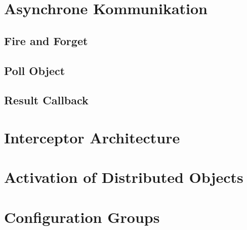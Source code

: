 \documentclass[a4paper,11pt]{article}
\begin{document}
\section{Asynchrone Kommunikation}
\subsection{Fire and Forget}
\subsection{Poll Object}
\subsection{Result Callback}

\section{Interceptor Architecture}

\section{Activation of Distributed Objects}

\section{Configuration Groups}
\end{document}
